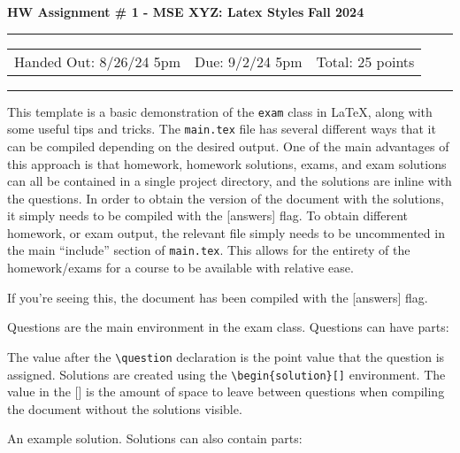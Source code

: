 \centering
\textbf{HW Assignment \# 1 - MSE XYZ: Latex Styles} \dotfill \textbf{Fall 2024}

\rule{\textwidth}{0.4pt}
\begin{center}
\begin{tabular}{c | c | c}
     Handed Out: 8/26/24 5pm & Due: 9/2/24 5pm & Total: 25 points\\
\end{tabular}
\end{center}
\rule{\textwidth}{0.4pt}
\begin{questions}
\question[5]
This template is a basic demonstration of the \verb|exam| class in LaTeX, along with some useful tips and tricks.
The \verb|main.tex| file has several different ways that it can be compiled depending on the desired output.
One of the main advantages of this approach is that homework, homework solutions, exams, and exam solutions can all be contained in a single project directory, and the solutions are inline with the questions.
In order to obtain the version of the document with the solutions, it simply needs to be compiled with the [answers] flag.
To obtain different homework, or exam output, the relevant file simply needs to be uncommented in the main ``include'' section of \verb|main.tex|.
This allows for the entirety of the homework/exams for a course to be available with relative ease.
\begin{solution}[1in]
If you're seeing this, the document has been compiled with the [answers] flag.
\end{solution}

\question[5]
Questions are the main environment in the exam class.
Questions can have parts:
The value after the \verb|\question| declaration is the point value that the question is assigned.
Solutions are created using the \verb|\begin{solution}[]| environment.
The value in the [] is the amount of space to leave between questions when compiling the document without the solutions visible.
\begin{solution}[1in]
An example solution.
Solutions can also contain parts:
\end{solution}


\end{questions}
